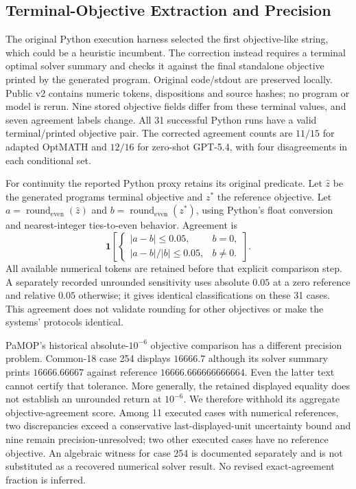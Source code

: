 \subsection{Terminal-Objective Extraction and Precision}
The original Python execution harness selected the first objective-like string, which could be a heuristic incumbent. The correction instead requires a terminal optimal solver summary and checks it against the final standalone objective printed by the generated program. Original code/stdout are preserved locally. Public v2 contains numeric tokens, dispositions and source hashes; no program or model is rerun. Nine stored objective fields differ from these terminal values, and seven agreement labels change. All 31 successful Python runs have a valid terminal/printed objective pair. The corrected agreement counts are $11/15$ for adapted OptMATH and $12/16$ for zero-shot GPT-5.4, with four disagreements in each conditional set.

For continuity the reported Python proxy retains its original predicate. Let $\hat z$ be the generated program\textquotesingle s terminal objective and $z^*$ the reference objective. Let $a=\operatorname{round}_{\mathrm{even}}(\hat z)$ and $b=\operatorname{round}_{\mathrm{even}}(z^*)$, using Python's float conversion and nearest-integer ties-to-even behavior. Agreement is
\begin{equation}
 \mathbf{1}\!\left[\begin{cases}|a-b|\leq0.05,&b=0,\\ |a-b|/|b|\leq0.05,&b\ne0.\end{cases}\right].
 \label{eq:common18-objective-proxy}
\end{equation}
All available numerical tokens are retained before that explicit comparison step. A separately recorded unrounded sensitivity uses absolute $0.05$ at a zero reference and relative $0.05$ otherwise; it gives identical classifications on these 31 cases. This agreement does not validate rounding for other objectives or make the systems' protocols identical.

PaMOP's historical absolute-$10^{-6}$ objective comparison has a different precision problem. Common-18 case 254 displays $16666.7$ although its solver summary prints $16666.66667$ against reference $16666.666666666664$. Even the latter text cannot certify that tolerance. More generally, the retained displayed equality does not establish an unrounded return at $10^{-6}$. We therefore withhold its aggregate objective-agreement score. Among 11 executed cases with numerical references, two discrepancies exceed a conservative last-displayed-unit uncertainty bound and nine remain precision-unresolved; two other executed cases have no reference objective. An algebraic witness for case 254 is documented separately and is not substituted as a recovered numerical solver result. No revised exact-agreement fraction is inferred.


